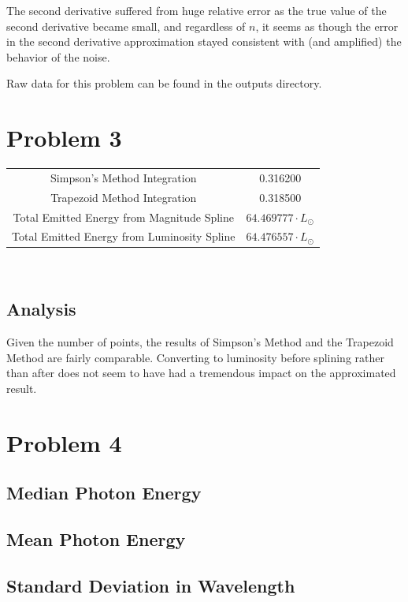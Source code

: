 \documentclass[11pt]{article} %
\begin{document}
The second derivative suffered from huge relative error as the true value of the second derivative became small, and regardless of $n$, it seems as though the error in the second derivative approximation stayed consistent with (and amplified) the behavior of the noise.

Raw data for this problem can be found in the outputs directory.

\section*{Problem 3}
\begin{tabular}{c c}
Simpson's Method Integration & 0.316200 \\
Trapezoid Method Integration & 0.318500 \\
Total Emitted Energy from Magnitude Spline & $64.469777\cdot L_\odot$\\
Total Emitted Energy from Luminosity Spline & $64.476557\cdot L_\odot$\\
\end{tabular}\\

\subsection*{Analysis}
Given the number of points, the results of Simpson's Method and the Trapezoid Method are fairly comparable. Converting to luminosity before splining rather than after does not seem to have had a tremendous impact on the approximated result.

\section*{Problem 4}

\subsection*{Median Photon Energy}
\subsection*{Mean Photon Energy}
\subsection*{Standard Deviation in Wavelength}
\end{document}
